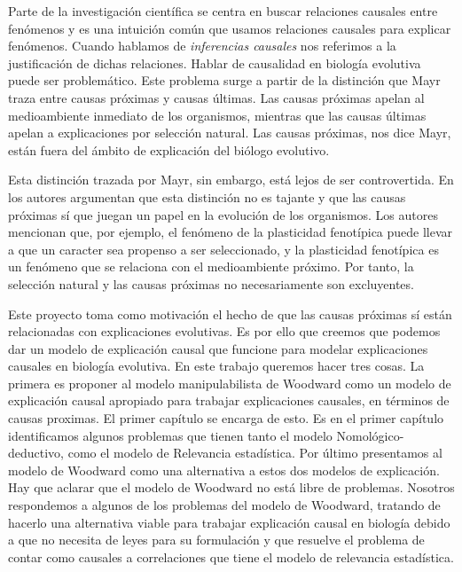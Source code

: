 Parte de la investigación científica se centra en buscar relaciones causales entre fenómenos y es una intuición común que usamos relaciones causales para explicar fenómenos. Cuando hablamos de \textit{inferencias causales} nos referimos a la justificación de dichas relaciones. Hablar de causalidad en biología evolutiva puede ser problemático. Este problema surge a partir de la distinción que Mayr \cite{Mayr1998} traza entre causas próximas y causas últimas. Las causas próximas apelan al medioambiente inmediato de los organismos, mientras que las causas últimas apelan a explicaciones por selección natural. Las causas próximas, nos dice Mayr, están fuera del ámbito de explicación del biólogo evolutivo.

Esta distinción trazada por Mayr, sin embargo, está lejos de ser controvertida. En \cite{Laland2011} los autores argumentan que esta distinción no es tajante y que las causas próximas sí que juegan un papel en la evolución de los organismos. Los autores mencionan que, por ejemplo, el fenómeno de la plasticidad fenotípica puede llevar a que un caracter sea propenso a ser seleccionado, y la plasticidad fenotípica es un fenómeno que se relaciona con el medioambiente próximo. Por tanto, la selección natural y las causas próximas no necesariamente son excluyentes.

Este proyecto toma como motivación el hecho de que las causas próximas sí están relacionadas con explicaciones evolutivas. Es por ello que creemos que podemos dar un modelo de explicación causal que funcione para modelar explicaciones causales en biología evolutiva. En este trabajo queremos hacer tres cosas. La primera es proponer al modelo manipulabilista de Woodward  \cite{Woodward2000, Woodward2003} como un modelo de explicación causal apropiado para trabajar explicaciones causales, en términos de causas proximas. El primer capítulo se encarga de esto. Es en el primer capítulo identificamos algunos problemas que tienen tanto el modelo Nomológico-deductivo, como el modelo de Relevancia estadística. Por último presentamos al modelo de Woodward como una alternativa a estos dos modelos de explicación. Hay que aclarar que el modelo de Woodward no está libre de problemas. Nosotros respondemos a algunos de los problemas del modelo de Woodward, tratando de hacerlo una alternativa viable para trabajar explicación causal en biología debido a que no necesita de leyes para su formulación y que resuelve el problema de contar como causales a correlaciones que tiene el modelo de relevancia estadística.

